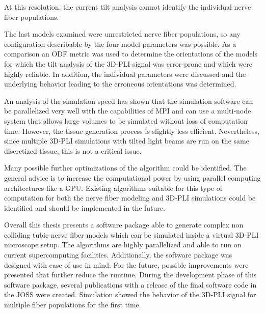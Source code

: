 At this resolution, the current tilt analysis cannot identify the individual nerve fiber populations.
\par
%
The last models examined were unrestricted nerve fiber populations, so any configuration describable by the four model parameters was possible.
As a comparison an \ac{ODF} metric was used to determine the orientations of the models for which the tilt analysis of the \ac{3D-PLI} signal was error-prone and which were highly reliable.
In addition, the individual parameters were discussed and the underlying behavior leading to the erroneous orientations was determined.
\par
%
An analysis of the simulation speed has shown that the simulation software can be parallelized very well with the capabilities of \ac{MPI} and can use a multi-node system that allows large volumes to be simulated without loss of computation time.
However, the tissue generation process is slightly less efficient.
Nevertheless, since multiple \ac{3D-PLI} simulations with tilted light beams are run on the same discretized tissue, this is not a critical issue.
\par
%
Many possible further optimizations of the algorithm could be identified.
The general advice is to increase the computational power by using parallel computing architectures like a \ac{GPU}.
Existing algorithms suitable for this type of computation for both the nerve fiber modeling and \ac{3D-PLI} simulations could be identified and should be implemented in the future.
\par
%
Overall this thesis presents a software package able to generate complex non colliding tubic nerve fiber models which can be simulated inside a virtual \ac{3D-PLI} microscope setup.
%
The algorithms are highly parallelized and able to run on current supercomputing facilities.
Additionally, the software package was designed with ease of use in mind.
%
For the future, possible improvements were presented that further reduce the runtime.
%
During the development phase of this software package, several publications with a release of the final software code in the \ac{JOSS} were created.
%
Simulation showed the behavior of the \ac{3D-PLI} signal for multiple fiber populations for the first time.